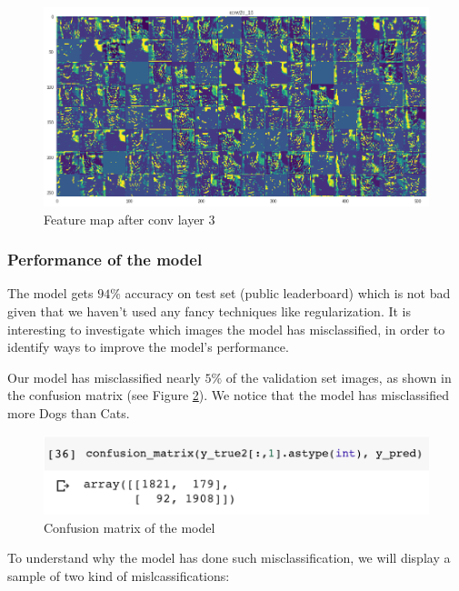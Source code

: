 \documentclass[a4paper]{article}
\begin{document}
\begin{figure}[h!]
	\centering
	\includegraphics[scale=.3]{fp3.png}
	\caption{Feature map after conv layer 3}
	\label{fig:fp3}
\end{figure}

\subsubsection{Performance of the model}
The model gets $94\%$ accuracy on test set (public leaderboard) which is not bad given that we haven't used any fancy techniques like regularization. It is interesting to investigate which images the model has misclassified, in order to identify ways to improve the model's performance. 

Our model has misclassified nearly $5\%$ of the validation set images, as shown in the confusion matrix (see Figure \ref{fig:confusion}). We notice that the model has misclassified more Dogs than Cats.

\begin{figure}[h!]
	\centering
	\includegraphics[scale=.5]{confusion.png}
	\caption{Confusion matrix of the model}
	\label{fig:confusion}
\end{figure}

To understand why the model has done such misclassification, we will display a sample of two kind of mislcassifications:
\end{document}
